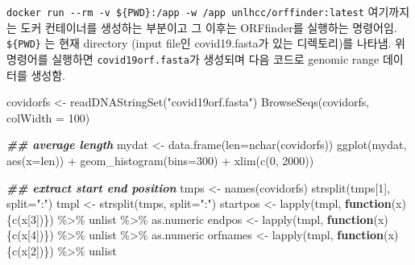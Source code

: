 \documentclass[
]{book}
\newenvironment{Shaded}{\begin{snugshade}}{\end{snugshade}}
\newcommand{\AttributeTok}[1]{\textcolor[rgb]{0.77,0.63,0.00}{#1}}
\newcommand{\ControlFlowTok}[1]{\textcolor[rgb]{0.13,0.29,0.53}{\textbf{#1}}}
\newcommand{\DecValTok}[1]{\textcolor[rgb]{0.00,0.00,0.81}{#1}}
\newcommand{\DocumentationTok}[1]{\textcolor[rgb]{0.56,0.35,0.01}{\textbf{\textit{#1}}}}
\newcommand{\FunctionTok}[1]{\textcolor[rgb]{0.00,0.00,0.00}{#1}}
\newcommand{\NormalTok}[1]{#1}
\newcommand{\OtherTok}[1]{\textcolor[rgb]{0.56,0.35,0.01}{#1}}
\newcommand{\SpecialCharTok}[1]{\textcolor[rgb]{0.00,0.00,0.00}{#1}}
\newcommand{\StringTok}[1]{\textcolor[rgb]{0.31,0.60,0.02}{#1}}
\begin{document}
\texttt{docker\ run\ -\/-rm\ -v\ \$\{PWD\}:/app\ -w\ /app\ unlhcc/orffinder:latest} 여기까지는 도커 컨테이너를 생성하는 부분이고 그 이후는 ORFfinder를 실행하는 명령어임. \texttt{\$\{PWD\}} 는 현재 directory (input file인 covid19.fasta가 있는 디렉토리)를 나타냄. 위 명령어를 실행하면 \texttt{covid19orf.fasta}가 생성되며 다음 코드로 genomic range 데이터를 생성함.

\begin{Shaded}
\begin{Highlighting}[]
\NormalTok{covidorfs }\OtherTok{\textless{}{-}} \FunctionTok{readDNAStringSet}\NormalTok{(}\StringTok{"covid19orf.fasta"}\NormalTok{)}
\FunctionTok{BrowseSeqs}\NormalTok{(covidorfs, }\AttributeTok{colWidth =} \DecValTok{100}\NormalTok{)}

\DocumentationTok{\#\# average length }
\NormalTok{mydat }\OtherTok{\textless{}{-}} \FunctionTok{data.frame}\NormalTok{(}\AttributeTok{len=}\FunctionTok{nchar}\NormalTok{(covidorfs))}
\FunctionTok{ggplot}\NormalTok{(mydat, }\FunctionTok{aes}\NormalTok{(}\AttributeTok{x=}\NormalTok{len)) }\SpecialCharTok{+}
  \FunctionTok{geom\_histogram}\NormalTok{(}\AttributeTok{bins=}\DecValTok{300}\NormalTok{) }\SpecialCharTok{+}
  \FunctionTok{xlim}\NormalTok{(}\FunctionTok{c}\NormalTok{(}\DecValTok{0}\NormalTok{, }\DecValTok{2000}\NormalTok{))}


\DocumentationTok{\#\# extract start end position }
\NormalTok{tmps }\OtherTok{\textless{}{-}} \FunctionTok{names}\NormalTok{(covidorfs)}
\FunctionTok{strsplit}\NormalTok{(tmps[}\DecValTok{1}\NormalTok{], }\AttributeTok{split=}\StringTok{":"}\NormalTok{)}
\NormalTok{tmpl }\OtherTok{\textless{}{-}} \FunctionTok{strsplit}\NormalTok{(tmps, }\AttributeTok{split=}\StringTok{":"}\NormalTok{)}
\NormalTok{startpos }\OtherTok{\textless{}{-}} \FunctionTok{lapply}\NormalTok{(tmpl, }\ControlFlowTok{function}\NormalTok{(x)\{}\FunctionTok{c}\NormalTok{(x[}\DecValTok{3}\NormalTok{])\}) }\SpecialCharTok{\%\textgreater{}\%}\NormalTok{ unlist }\SpecialCharTok{\%\textgreater{}\%}\NormalTok{ as.numeric}
\NormalTok{endpos }\OtherTok{\textless{}{-}} \FunctionTok{lapply}\NormalTok{(tmpl, }\ControlFlowTok{function}\NormalTok{(x)\{}\FunctionTok{c}\NormalTok{(x[}\DecValTok{4}\NormalTok{])\}) }\SpecialCharTok{\%\textgreater{}\%}\NormalTok{ unlist }\SpecialCharTok{\%\textgreater{}\%}\NormalTok{ as.numeric}
\NormalTok{orfnames }\OtherTok{\textless{}{-}} \FunctionTok{lapply}\NormalTok{(tmpl, }\ControlFlowTok{function}\NormalTok{(x)\{}\FunctionTok{c}\NormalTok{(x[}\DecValTok{2}\NormalTok{])\}) }\SpecialCharTok{\%\textgreater{}\%}\NormalTok{ unlist }


\end{Highlighting}
\end{Shaded}
\end{document}
